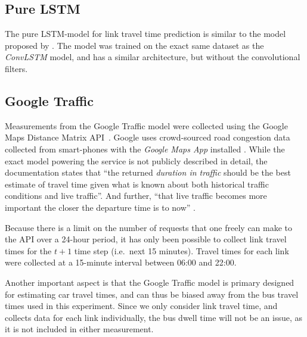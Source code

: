 \documentclass[preprint,11pt,5p,twocolumn]{elsarticle}
\begin{document}
\subsection{Pure LSTM}
The pure LSTM-model for link travel time prediction is similar to the model proposed by \citet{YanjieDuan2016}. The model was trained on the exact same dataset as the \emph{ConvLSTM} model, and has a similar architecture, but without the convolutional filters.

\subsection{Google Traffic}
Measurements from the Google Traffic model were collected using the Google Maps Distance Matrix API~\citep{GMaps_DistanceMatrixAPI}. Google uses crowd-sourced road congestion data collected from smart-phones with the \emph{Google Maps App} installed \citep{GMaps_Crowdsourcing}. While the exact model powering the service is not publicly described in detail, the documentation states that ``the returned \emph{duration in traffic} should be the best estimate of travel time given what is known about both historical traffic conditions and live traffic''. And further, ``that live traffic becomes more important the closer the departure time is to now'' \citep{GMaps_DistanceMatrixAPI}.

Because there is a limit on the number of requests that one freely can make to the API over a 24-hour period, it has only been possible to collect link travel times for the $t + 1$ time step (i.e.\ next 15 minutes). Travel times for each link were collected at a 15-minute interval between 06:00 and 22:00.

Another important aspect is that the Google Traffic model is primary designed for estimating car travel times, and can thus be biased away from the bus travel times used in this experiment. Since we only consider link travel time, and collects data for each link individually, the bus dwell time will not be an issue, as it is not included in either measurement.
\end{document}
